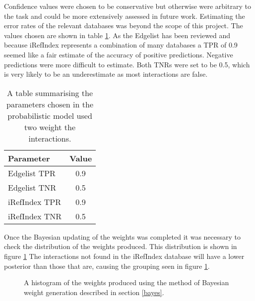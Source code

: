 Confidence values were chosen to be conservative but otherwise were arbitrary to the task and could be more extensively assessed in future work.
Estimating the error rates of the relevant databases was beyond the scope of this project.
The values chosen are shown in table \ref{tab:estimates}.
As the Edgelist has been reviewed and because iRefIndex represents a combination of many databases a \ac{TPR} of 0.9 seemed like a fair estimate of the accuracy of positive predictions.
Negative predictions were more difficult to estimate.
Both TNRs were set to be 0.5, which is very likely to be an underestimate as most interactions are false.

\begin{table}
    \centering
    \begin{tabular}{l c }
        Parameter       & Value \\
        \hline
        Edgelist \ac{TPR}    & 0.9 \\
        Edgelist TNR    & 0.5 \\
        iRefIndex \ac{TPR}   & 0.9 \\
        iRefIndex TNR   & 0.5 \\
    \end{tabular}
    \caption{A table summarising the parameters chosen in the probabilistic model used two weight the interactions.}
    \label{tab:estimates}
\end{table}

Once the Bayesian updating of the weights was completed it was necessary to check the distribution of the weights produced.
This distribution is shown in figure \ref{fig:weightdist}
The interactions not found in the iRefIndex database will have a lower posterior than those that are, causing the grouping seen in figure \ref{fig:weightdist}.

\begin{figure}
    \centering
    \setlength\figureheight{3in}
    \setlength\figurewidth{4in}
    \caption{A histogram of the weights produced using the method of Bayesian weight generation described in section \ref{bayes}.}
    \label{fig:weightdist}
\end{figure}

